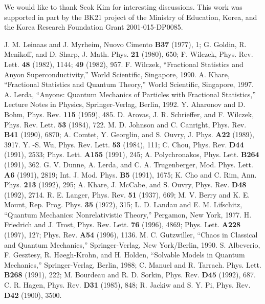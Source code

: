 \documentclass[a4paper,aps,eqsecnum,preprint,preprintnumbers,12pt]{revtex4}
\begin{document}
We would like to thank Seok Kim for interesting discussions. This
work was supported in part by the BK21 project of the Ministry of
Education, Korea, and the Korea Research Foundation Grant
2001-015-DP0085.

\begin{thebibliography}{12345}
 J. M. Leinaas and J. Myrheim, Nuovo Cimento
{\bf B37} (1977), 1; G. Goldin, R. Menikoff, and D. Sharp, J.
Math. Phys. {\bf 21} (1980), 650; F. Wilczek, Phys. Rev. Lett.
{\bf 48} (1982), 1144; {\bf 49} (1982), 957.
 F. Wilczek, ``Fractional Statistics and
Anyon Superconductivity,'' World Scientific, Singapore, 1990.
 A. Khare, ``Fractional Statistics and Quantum
Theory,'' World Scientific, Singapore, 1997.
 A. Lerda, ``Anyons: Quantum Mechanics of Particles
with Fractional Statistics,'' Lecture Notes in Physics,
Springer-Verlag, Berlin, 1992.
 Y. Aharonov and D. Bohm, Phys. Rev. {\bf 115}
(1959), 485.
 D. Arovas, J. R. Schrieffer, and F. Wilczek,
Phys. Rev. Lett. {\bf 53} (1984), 722.
 M. D. Johnson and C. Canright, Phys. Rev. {\bf
B41} (1990), 6870; A. Comtet, Y. Georglin, and S. Ouvry, J. Phys.
{\bf A22} (1989), 3917.
 Y. -S. Wu, Phys. Rev. Lett. {\bf 53} (1984), 111; C.
Chou, Phys. Rev. {\bf D44} (1991), 2533; Phys. Lett. {\bf A155}
(1991), 245; A. Polychronakos, Phys. Lett. {\bf B264} (1991), 362.
 G. V. Dunne, A. Lerda, and C. A. Trugenberger,
Mod. Phys. Lett. {\bf A6} (1991), 2819; Int. J. Mod. Phys. {\bf
B5} (1991), 1675; K. Cho and C. Rim, Ann. Phys. {\bf 213} (1992),
295; A. Khare, J. McCabe, and S. Ouvry, Phys. Rev. {\bf D48}
(1992), 2714.
 R. E. Langer, Phys. Rev. {\bf 51} (1937), 669; M.
V. Berry and K. E. Mount, Rep. Prog. Phys. {\bf 35} (1972), 315;
L. D. Landau and E. M. Lifschitz, ``Quantum Mechanics:
Nonrelativistic Theory,'' Pergamon, New York, 1977.
 H. Friedrich and J. Trost, Phys. Rev. Lett.
{\bf 76} (1996), 4869; Phys. Lett. {\bf A228} (1997), 127; Phys.
Rev. {\bf A54} (1996), 1136.
 M. C. Gutzwiller, ``Chaos in Classical and
Quantum Mechanics,'' Springer-Verlag, New York/Berlin, 1990.
 S. Albeverio, F. Gesztesy, R. H\o egh-Krohn,
and H. Holden, ``Solvable Models in Quantum Mechanics,''
Springer-Verlag, Berlin, 1988; C. Manuel and R. Tarrach. Phys.
Lett. {\bf B268} (1991), 222; M. Bourdeau and R. D. Sorkin, Phys.
Rev. {\bf D45} (1992), 687.
 C. R. Hagen, Phys. Rev. {\bf D31} (1985), 848; R.
Jackiw and S. Y. Pi, Phys. Rev. {\bf D42} (1900), 3500.

\end{thebibliography}
\end{document}
